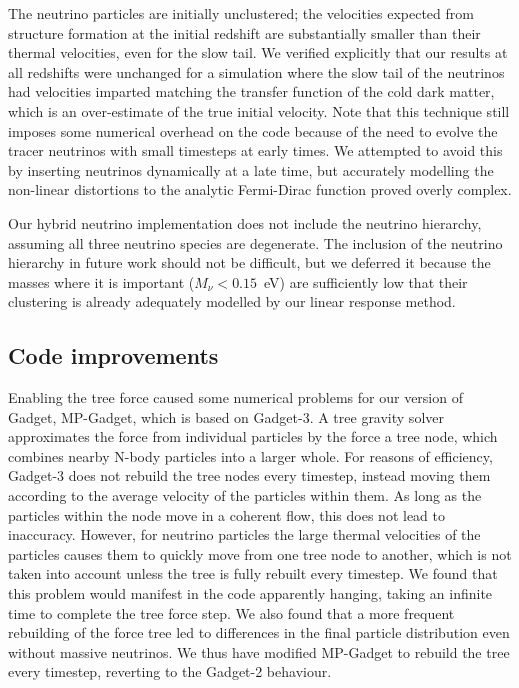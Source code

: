 \documentclass[useAMS, usenatbib]{mnras}
\begin{document}
The neutrino particles are initially unclustered; the velocities expected from structure formation at the initial redshift are substantially smaller than their thermal velocities, even for the slow tail. We verified explicitly that our results at all redshifts were unchanged for a simulation where the slow tail of the neutrinos had velocities imparted matching the transfer function of the cold dark matter, which is an over-estimate of the true initial velocity.
Note that this technique still imposes some numerical overhead on the code because of the need to evolve the tracer neutrinos with small timesteps at early times. We attempted to avoid this by inserting neutrinos dynamically at a late time, but accurately modelling the non-linear distortions to the analytic Fermi-Dirac function proved overly complex.

Our hybrid neutrino implementation does not include the neutrino hierarchy, assuming all three neutrino species are degenerate. The inclusion of the neutrino hierarchy in future work should not be difficult, but we deferred it because the masses where it is important ($M_\nu < 0.15$~eV) are sufficiently low that their clustering is already adequately modelled by our linear response method.

\subsection{Code improvements}
\label{sec:code}

Enabling the tree force caused some numerical problems for our version of Gadget, MP-Gadget, which is based on Gadget-3.
A tree gravity solver approximates the force from individual particles by the force a tree node, which combines nearby N-body particles into a larger whole. For reasons of efficiency, Gadget-3 does not rebuild the tree nodes every timestep, instead moving them according to the average velocity of the particles within them. As long as the particles within the node move in a coherent flow, this does not lead to inaccuracy. However, for neutrino particles the large thermal velocities of the particles causes them to quickly move from one tree node to another, which is not taken into account unless the tree is fully rebuilt every timestep. We found that this problem would manifest in the code apparently hanging, taking an infinite time to complete the tree force step. We also found that a more frequent rebuilding of the force tree led to differences in the final particle distribution even without massive neutrinos. We thus have modified MP-Gadget to rebuild the tree every timestep, reverting to the Gadget-2 behaviour.
\end{document}
